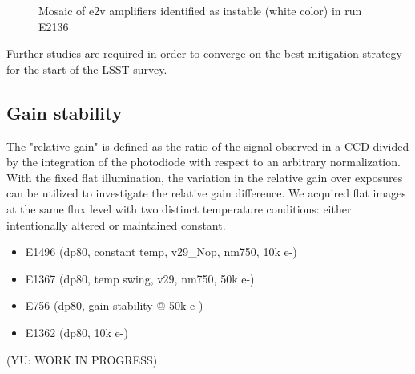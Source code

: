 \begin{figure}[htbp]
\begin{minipage}{0.45\textwidth}
    \caption{Mosaic of e2v amplifiers identified as instable (white color) in run E2136}
\end{minipage}
\end{figure}

%

Further studies are required in order to converge on the best mitigation
strategy for the start of the LSST survey.

\subsection{Gain stability}\label{gain-stability-2}
The "relative gain" is defined as the ratio of the signal observed in a CCD divided by the integration of the photodiode with respect to an arbitrary normalization.
With the fixed flat illumination, the variation in the relative gain over exposures can be utilized to investigate the relative gain difference. We acquired flat images at the same flux level with two distinct temperature conditions: either intentionally altered or maintained constant.
\begin{itemize}
    \item E1496 (dp80, constant temp, v29\_Nop, nm750, 10k e-)
    \item E1367 (dp80, temp swing, v29, nm750, 50k e-)
    \item E756 (dp80, gain stability @ 50k e-)
    \item E1362 (dp80, 10k e-)
\end{itemize}
(YU: WORK IN PROGRESS)


